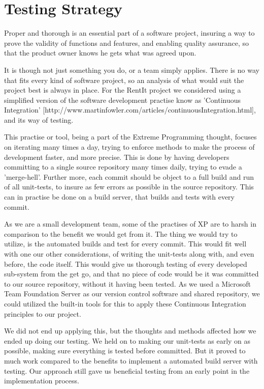 \section{Testing Strategy}
Proper and thorough is an essential part of a software project, insuring a way to prove the validity of functions and features, and enabling quality assurance, so that the product owner knows he gets what was agreed upon. \

It is though not just something you do, or a team simply applies. There is no way that fits every kind of software project, so an analysis of what would suit the project best is always in place. For the RentIt project we considered using a simplified version of the software development practise know as 'Continuous Integration' [http://www.martinfowler.com/articles/continuousIntegration.html], and its way of testing.

This practise or tool, being a part of the Extreme Programming thought, focuses on iterating many times a day, trying to enforce methods to make the process of development faster, and more precise. This is done by having developers committing to a single source repository many times daily, trying to evade a 'merge-hell'. Further more, each commit should be object to a full build and run of all unit-tests, to insure as few errors as possible in the source repository. This can in practise be done on a build server, that builds and tests with every commit.

As we are a small development team, some of the practises of XP are to harsh in comparison to the benefit we would get from it. The thing we would try to utilize, is the automated builds and test for every commit. This would fit well with one our other considerations, of writing the unit-tests along with, and even before, the code itself. This would give us thorough testing of every developed sub-system from the get go, and that no piece of code would be it was committed to our source repository, without it having been tested. As we used a Microsoft Team Foundation Server as our version control software and shared repository, we could utilized the built-in tools for this to apply these Continuous Integration principles to our project.

We did not end up applying this, but the thoughts and methods affected how we ended up doing our testing. We held on to making our unit-tests as early on as possible, making sure everything is tested before committed. But it proved to much work compared to the benefits to implement a automated build server with testing. Our approach still gave us beneficial testing from an early point in the implementation process.\

